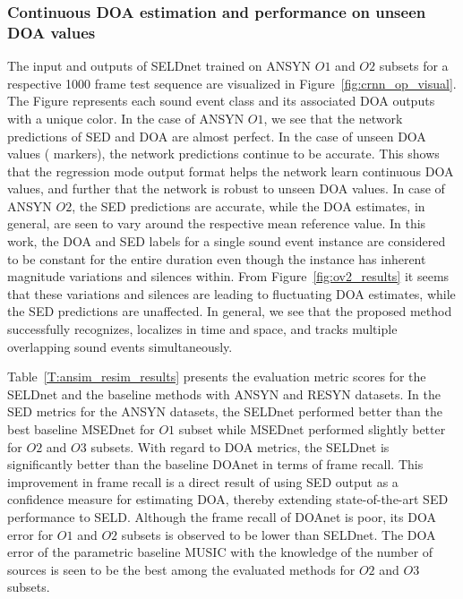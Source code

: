 \documentclass[journal]{IEEEtran}
\begin{document}
\subsubsection{Continuous DOA estimation and performance on unseen DOA values} \label{sssec:cont_doa_est}
The input and outputs of SELDnet trained on ANSYN $O1$ and $O2$ subsets for a respective 1000 frame test sequence are visualized in Figure~\ref{fig:crnn_op_visual}. The Figure represents each sound event class and its associated DOA outputs with a unique color. In the case of ANSYN $O1$, we see that the network predictions of SED and DOA are almost perfect. In the case of unseen DOA values (\texttimes{} markers), the network predictions continue to be accurate. This shows that the regression mode output format helps the network learn continuous DOA values, and further that the network is robust to unseen DOA values. In case of ANSYN $O2$, the SED predictions are accurate, while the DOA estimates, in general, are seen to vary around the respective mean reference value. In this work, the DOA and SED labels for a single sound event instance are considered to be constant for the entire duration even though the instance has inherent magnitude variations and silences within. From Figure~\ref{fig:ov2_results} it seems that these variations and silences are leading to fluctuating DOA estimates, while the SED predictions are unaffected. In general, we see that the proposed method successfully recognizes, localizes in time and space, and tracks multiple overlapping sound events simultaneously.



Table~\ref{T:ansim_resim_results} presents the evaluation metric scores for the SELDnet and the baseline methods with ANSYN and RESYN datasets. In the SED metrics for the ANSYN datasets, the SELDnet performed better than the best baseline MSEDnet for $O1$ subset while MSEDnet performed slightly better for $O2$ and $O3$ subsets. With regard to DOA metrics, the SELDnet is significantly better than the baseline DOAnet in terms of frame recall. This improvement in frame recall is a direct result of using SED output as a confidence measure for estimating DOA, thereby extending state-of-the-art SED performance to SELD. Although the frame recall of DOAnet is poor, its DOA error for $O1$ and $O2$ subsets is observed to be lower than SELDnet. The DOA error of the parametric baseline MUSIC with the knowledge of the number of sources is seen to be the best among the evaluated methods for $O2$ and $O3$ subsets. 
\end{document}
